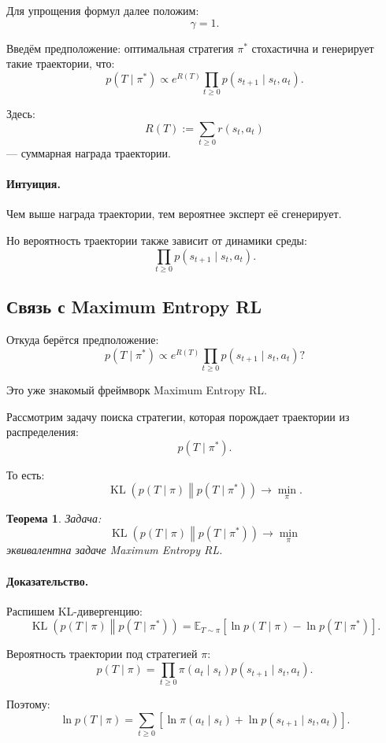 \documentclass[12pt,a4paper]{article}
\newtheorem{theorem}{Теорема}
\begin{document}
Для упрощения формул далее положим:
\[
\gamma=1.
\]

Введём предположение: оптимальная стратегия $\pi^\ast$ стохастична и генерирует такие траектории, что:
\[
p(T\mid \pi^\ast)
\propto
e^{R(T)}
\prod_{t\ge 0}
p(s_{t+1}\mid s_t,a_t).
\]

Здесь:
\[
R(T)
:=
\sum_{t\ge 0}
r(s_t,a_t)
\]
--- суммарная награда траектории.

\paragraph{Интуиция.}

Чем выше награда траектории, тем вероятнее эксперт её сгенерирует.

Но вероятность траектории также зависит от динамики среды:
\[
\prod_{t\ge 0}
p(s_{t+1}\mid s_t,a_t).
\]

\subsection{Связь с Maximum Entropy RL}

Откуда берётся предположение:
\[
p(T\mid \pi^\ast)
\propto
e^{R(T)}
\prod_{t\ge 0}
p(s_{t+1}\mid s_t,a_t)?
\]

Это уже знакомый фреймворк Maximum Entropy RL.

Рассмотрим задачу поиска стратегии, которая порождает траектории из распределения:
\[
p(T\mid \pi^\ast).
\]

То есть:
\[
\operatorname{KL}
\left(
p(T\mid \pi)
\middle\|
p(T\mid \pi^\ast)
\right)
\to
\min_\pi.
\]

\begin{theorem}
Задача:
\[
\operatorname{KL}
\left(
p(T\mid \pi)
\middle\|
p(T\mid \pi^\ast)
\right)
\to
\min_\pi
\]
эквивалентна задаче Maximum Entropy RL.
\end{theorem}

\paragraph{Доказательство.}

Распишем KL-дивергенцию:
\[
\operatorname{KL}
\left(
p(T\mid \pi)
\middle\|
p(T\mid \pi^\ast)
\right)
=
\mathbb E_{T\sim\pi}
\left[
\ln p(T\mid\pi)
-
\ln p(T\mid\pi^\ast)
\right].
\]

Вероятность траектории под стратегией $\pi$:
\[
p(T\mid\pi)
=
\prod_{t\ge 0}
\pi(a_t\mid s_t)
p(s_{t+1}\mid s_t,a_t).
\]

Поэтому:
\[
\ln p(T\mid\pi)
=
\sum_{t\ge 0}
\left[
\ln\pi(a_t\mid s_t)
+
\ln p(s_{t+1}\mid s_t,a_t)
\right].
\]
\end{document}
